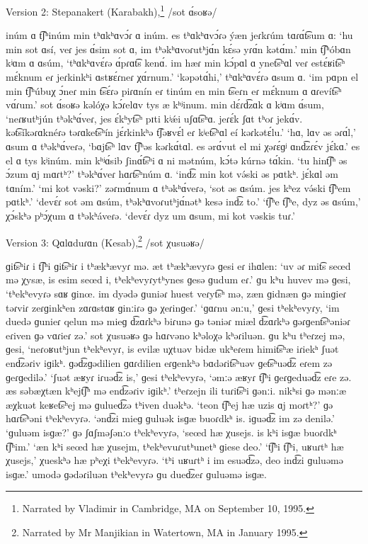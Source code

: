 \begin{exe}
\begin{xlist}

\ex Version 2:  Stepanakert  (Karabakh),\footnote{Narrated by Vladimir in Cambridge, MA on September 10, 1995.} /sot \'ɑsoʁǝ/

inúm ɑ t͡ʃʰinúm min tʰɑkʰɑvɔ́ɾ ɑ inúm.  es tʰɑkʰɑvɔ́ɾǝ ýæn jeɾkɾúm tɑɾɑ́t͡sum ɑ:  ‘hu min sot ɑsí, veɾ jes ɑ́sim sot ɑ, im tʰǝkʰɑvoɾutʰjɑ́n kɛ́sǝ yɾɑ́n kǝtɑ́m.’  min t͡ʃʰóbɑn kʲɑm ɑ ɑsúm, ‘tʰɑkʰɑvɛ́ɾǝ ɑ́pɾɑt͡s kenɑ́.  im hæɾ min kɔ́pɑl ɑ ynet͡sʰɑl veɾ estɛ́ʁit͡sʰ mɛ́knum eɾ jeɾkinkʰi ɑstʁɛ́ɾneɾ χɑ́rnum.’  ‘kǝpǝtɑ́hi,’ tʰɑkʰɑvɛ́ɾǝ ɑsum ɑ.  ‘im pɑpn el min t͡ʃʰúbuχ ɔ́neɾ min t͡sɛ́ɾǝ piɾɑnín eɾ tinúm en min t͡seɾn eɾ mɛ́knum ɑ ɑɾevít͡sʰ vɑ́ɾum.’  sot ɑ́soʁǝ kǝlóχǝ kɔ́ɾelɑv tys æ kʰʲinum.  min dɛ́ɾd͡zɑk ɑ kʲɑm ɑ́sum, ‘neɾʁutʰjún tʰǝkʰɑ́veɾ, jes ɛ́kʰyt͡sʰ pɪti kʲǽi uʃɑt͡sʰɑ.  jeɾɛ́k ʃɑt tʰoɾ jekɑ́v.  kǝt͡síkǝɾɑknéɾǝ tǝɾɑket͡sʰín jɛ́ɾkinkʰǝ t͡ʃǝʁvɛ́l eɾ kʲet͡sʰɑl eí kǝɾkǝtɛ́lu.’  ‘hɑ, lɑv ǝs ǝɾɑ́l,’  ɑsum ɑ tʰǝkʰɑ́veɾǝ, ‘bɑjt͡sʰ lɑv t͡ʃʰǝs kǝɾkɑ́tɑl.  es ǝrɑ́vut el mi χǝɾɛ́ɡʲ ɑnd͡zɾɛ́v jɛ́kɑ.’  es el ɑ tys kʲinúm.  min kʰʲɑ́sib ʃinɑ́t͡sʰi ɑ ni mǝtnúm, kɔ́tǝ kúrnǝ tɑ́kin.  ‘tu hint͡ʃʰ ǝs ɔ́zum ɑj mɑɾtʰ?’ tʰǝkʰɑ́veɾ hɑɾt͡sʰnúm ɑ.  ‘ind͡z min kot vǝ́ski ǝs pɑtkʰ.  jɛ́kɑl ǝm tɑním.’  ‘mi kot vǝski?’  zǝɾmɑ́num ɑ tʰǝkʰɑ́veɾǝ, ‘sot ǝs ɑsúm.  jes kʰez vǝ́ski t͡ʃʰem pɑtkʰ.’  ‘devɛ́ɾ sot ǝm ɑsúm, tʰǝkʰɑvoɾutʰjɑ́nǝtʰ kesǝ ind͡z to.’  ‘t͡ʃʰe t͡ʃʰe, dyz ǝs ɑsúm,’ χɔ́skʰǝ pʰɔ́χum ɑ tʰǝkʰáveɾǝ.  ‘devɛ́ɾ dyz um ɑsum, mi kot vǝskis tuɾ.’

\ex Version 3:    Qɑlɑduɾɑn  (Kesab),\footnote{Narrated by Mr Manjikian in Watertown, MA in January 1995.} /sot χusuǝʁǝ/

ɡit͡sʰiɾ i t͡ʃʰi ɡit͡sʰiɾ i tʰækʰævyɾ mǝ.  æt tʰækʰævyɾǝ ɡesi eɾ ihɑlen:  ‘uv ǝɾ mit͡s seœd mǝ χysæ, is esim seœd i, tʰekʰevyɾytʰynes ɡesǝ ɡudum eɾ.’  ɡu kʰu huvev mǝ ɡesi, ‘tʰekʰevyɾǝ sɑʁ ɡinœ.  im dyǝdǝ ɡuniǝɾ huest veɾyt͡sʰ mǝ, zæn ɡidnæn ɡǝ minɡieɾ tǝɾviɾ zeɾɡinkʰen zɑɾɑstɑʁ ɡinːiɾǝ ɡǝ χeɾinɡeɾ.’  ‘ɡɑɾnu ǝnːu,’  ɡesi tʰekʰevyɾy, ‘im duedǝ ɡunieɾ qelun mǝ mieɡ d͡zɑɾkʰǝ biɾunǝ ɡǝ tǝniǝɾ miæl d͡zɑɾkʰǝ ɡǝɾɡent͡sʰǝniǝɾ eɾiven ɡǝ vɑɾieɾ zǝ.’  sot χusuǝʁǝ ɡǝ hɑɾvǝno kʰǝloχǝ kʰǝɾiluǝn.  ɡu kʰu tʰeɾzej mǝ, ɡesi, ‘neɾoʁutʰjun tʰekʰevyɾ, is evilæ uχtuǝv bidæ ukʰeɾem himit͡sʰæ iɾiekʰ ʃuǝt end͡zǝɾiv iɡikʰ.  ɡǝd͡zɡǝdilien ɡɑɾdilien eɾɡenkʰǝ bɑdǝɾit͡sʰuǝv ɡet͡sʰuǝd͡z eɾem zǝ ɡeɾɡedilǝ.’  ‘ʃuǝt æʁyɾ iɾuǝd͡z is,’ ɡesi tʰekʰevyɾǝ, ‘ǝmːǝ æʁyɾ t͡ʃʰi ɡeɾɡeduǝd͡z eɾe zǝ. æs sǝbæχtæn kʰejt͡ʃʰ mǝ end͡zǝɾiv iɡikʰ.’  tʰeɾzejn ili tuɾit͡sʰi ɡǝnːi.  nikʰsi ɡǝ mǝnːæ æχkuǝt keʁet͡sʰej mǝ ɡulued͡zǝ tʰiven duǝkʰǝ.  ‘teon t͡ʃʰej hæ uzis ɑj moɾtʰ?’ ɡǝ hɑɾt͡sʰǝni tʰekʰevyɾǝ.  ‘ǝnd͡zi mieɡ ɡuluǝk isɡæ buoɾdkʰ is.  iɡuǝd͡z im zǝ denilǝ.’  ‘ɡuluǝm isɡæ?’  ɡǝ ʃɑʃmǝʃǝnːo tʰekʰevyɾǝ, ‘seœd hæ χusejs.  is kʰi isɡæ buoɾdkʰ t͡ʃʰim.’  ‘æn kʰi seœd hæ χusejm, tʰekʰevuɾutʰunetʰ ɡiese deo.’  ‘t͡ʃʰi t͡ʃʰi, uʁuɾtʰ hæ χusejs,’ χueskʰǝ hæ pʰeχi tʰekʰevyɾǝ.  ‘tʰi uʁuɾtʰ i im esuǝd͡zǝ, deo ind͡zi ɡuluǝmǝ isɡæ.’  umodǝ ɡǝdǝɾiluǝn tʰekʰevyɾǝ ɡu dued͡zeɾ ɡuluǝmǝ isɡæ.
\end{xlist}
	\end{exe}

